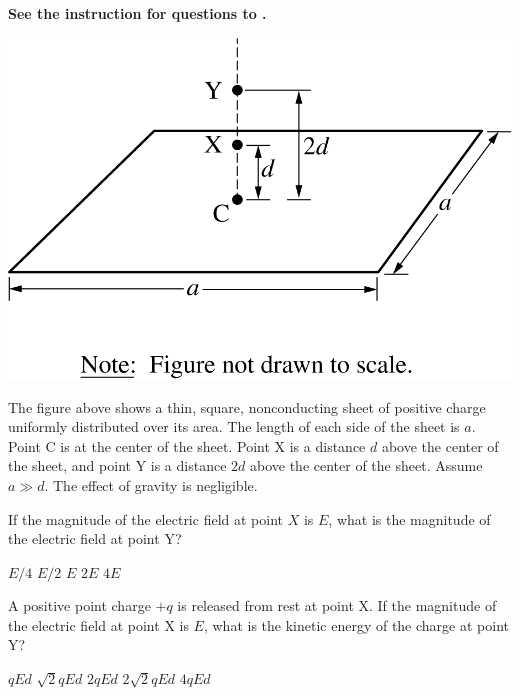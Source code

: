 
\textbf{See the instruction for questions  to .} 

\begin{center}
    \includegraphics[scale=0.3]{images/img-002-000.png}
\end{center}

The figure above shows a thin, square, nonconducting sheet of positive charge uniformly distributed over its area. The length of each side of the sheet is $a$. Point $\mathrm{C}$ is at the center of the sheet. Point $\mathrm{X}$ is a distance $d$ above the center of the sheet, and point $\mathrm{Y}$ is a distance $2d$ above the center of the sheet. Assume $a \gg d$. The effect of gravity is negligible.

\begin{questions}
\setcounter{question}{0}

\question
If the magnitude of the electric field at point $X$ is $E$, what is the magnitude of the electric field at point $\mathrm{Y}$?

\begin{oneparchoices}
    \choice $E / 4$
    \choice $E / 2$
    \choice $E$
    \choice $2E$
    \choice $4E$
\end{oneparchoices}

\question
A positive point charge $+q$ is released from rest at point $\mathrm{X}$. If the magnitude of the electric field at point $\mathrm{X}$ is $E$, what is the kinetic energy of the charge at point $\mathrm{Y}$?

\begin{oneparchoices}
    \choice $q E d$
    \choice $\sqrt{2} q E d$
    \choice $2 q E d$
    \choice $2 \sqrt{2} q E d$
    \choice $4 q E d$
\end{oneparchoices}

\end{questions}
